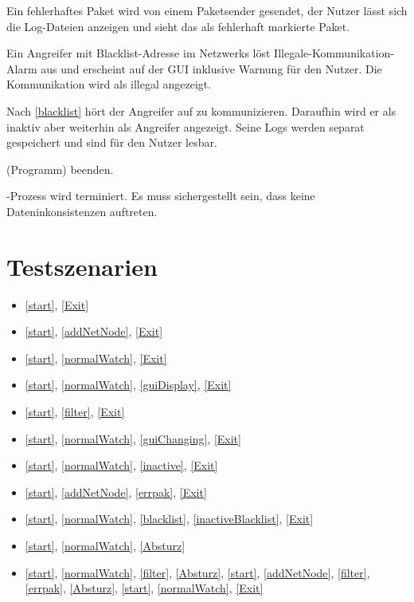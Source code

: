 \begin{description}[style=multiline, leftmargin=4cm, labelwidth=4cm]
  \item[\namedlabel{errpak}{Fehlerhaftes Paket}] Ein fehlerhaftes Paket wird von einem Paketsender gesendet, der Nutzer lässt sich die Log-Dateien anzeigen und sieht das als fehlerhaft markierte Paket.
  \item[\namedlabel{blacklist}{Blacklist}] Ein Angreifer mit Blacklist-Adresse im Netzwerks löst Illegale-Kommunikation-Alarm aus und erscheint auf der GUI inklusive Warnung für den Nutzer. Die Kommunikation wird als illegal angezeigt.
  \item[\namedlabel{inactiveBlacklist}{Inaktiver geblacklisteter Teilnehmer}] Nach \ref{blacklist} hört der Angreifer auf zu kommunizieren. Daraufhin wird er als inaktiv aber weiterhin als Angreifer angezeigt. Seine Logs werden separat gespeichert und sind für den Nutzer lesbar.
  \item[\namedlabel{Exit}{Exit}] \programname (Programm) beenden.
  \item[\namedlabel{Absturz}{Absturz}] \programname-Prozess wird terminiert. Es muss sichergestellt sein, dass keine Dateninkonsistenzen auftreten.
\end{description}

\section{Testszenarien}

\begin{itemize}
  \item \ref{start}, \ref{Exit}
  \item \ref{start}, \ref{addNetNode}, \ref{Exit}
  \item \ref{start}, \ref{normalWatch}, \ref{Exit}
  \item \ref{start}, \ref{normalWatch}, \ref{guiDisplay}, \ref{Exit}
  \item \ref{start}, \ref{filter}, \ref{Exit}
  \item \ref{start}, \ref{normalWatch}, \ref{guiChanging}, \ref{Exit}
  \item \ref{start}, \ref{normalWatch}, \ref{inactive}, \ref{Exit}
  \item \ref{start}, \ref{addNetNode}, \ref{errpak}, \ref{Exit}
  \item \ref{start}, \ref{normalWatch}, \ref{blacklist}, \ref{inactiveBlacklist}, \ref{Exit}
  \item \ref{start}, \ref{normalWatch}, \ref{Absturz}
  \item \ref{start}, \ref{normalWatch}, \ref{filter}, \ref{Absturz}, \ref{start}, \ref{addNetNode}, \ref{filter}, \ref{errpak}, \ref{Absturz}, \ref{start}, \ref{normalWatch}, \ref{Exit}
\end{itemize}
